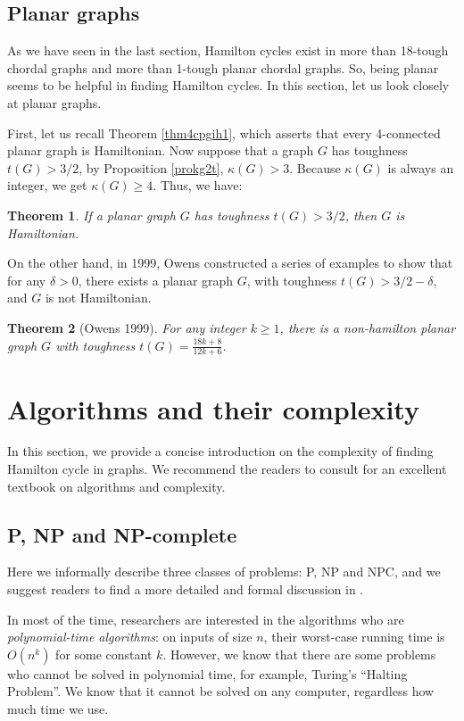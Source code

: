 \documentclass[12pt]{report}
\newtheorem{theorem}{Theorem}
\begin{document}
\subsection{Planar graphs}

As we have seen in the last section, Hamilton cycles exist in more than 18-tough chordal graphs and more than 1-tough planar chordal graphs. So, being planar seems to be helpful in finding Hamilton cycles. In this section, let us look closely at planar graphs.

First, let us recall Theorem \ref{thm4cpgih1}, which asserts that every 4-connected planar graph is Hamiltonian. Now suppose that a graph $G$ has toughness $t(G)>3/2$, by Proposition \ref{prokg2t}, $\kappa(G)>3$. Because $\kappa(G)$ is always an integer, we get $\kappa(G)\ge4$. Thus, we have:
\begin{theorem}
If a planar graph $G$ has toughness $t(G)>3/2$, then $G$ is Hamiltonian.
\end{theorem}

On the other hand, in 1999, Owens \cite{owens1999nonhamiltonian} constructed a series of examples to show that for any $\delta>0$, there exists a planar graph $G$, with toughness $t(G)>3/2-\delta$, and $G$ is not Hamiltonian.

\begin{theorem}[Owens 1999]\label{cethmow32tnh}
For any integer $k\ge1$, there is a non-hamilton planar graph $G$ with toughness $t(G)=\frac{18k+8}{12k+6}$.
\end{theorem}



\section{Algorithms and their complexity}
In this section, we provide a concise introduction on the complexity of finding Hamilton cycle in graphs. We recommend the readers to consult \cite{cormen2001introduction} for an excellent textbook on algorithms and complexity.


\subsection{P, NP and NP-complete}
Here we informally describe three classes of problems: P, NP and NPC, and we suggest readers to find a more detailed and formal discussion in \cite{cormen2001introduction}.

In most of the time, researchers are interested in the algorithms who are {\em polynomial-time algorithms}: on inputs of size $n$, their worst-case running time is $O(n^k)$ for some constant $k$. However, we know that there are some problems who cannot be solved in polynomial time, for example,  Turing's ``Halting Problem''. We know that it cannot be solved on any computer, regardless how much time we use.
\end{document}
